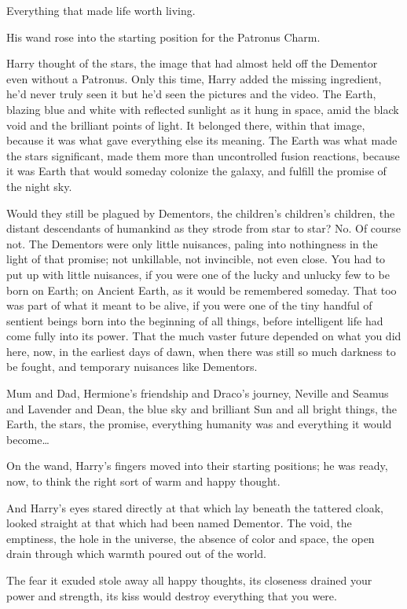 Everything that made life worth living.

His wand rose into the starting position for the Patronus Charm.

Harry thought of the stars, the image that had almost held off the Dementor
even without a Patronus. Only this time, Harry added the missing ingredient,
he'd never truly seen it but he'd seen the pictures and the video. The Earth,
blazing blue and white with reflected sunlight as it hung in space, amid the
black void and the brilliant points of light. It belonged there, within that
image, because it was what gave everything else its meaning. The Earth was what
made the stars significant, made them more than uncontrolled fusion reactions,
because it was Earth that would someday colonize the galaxy, and fulfill the
promise of the night sky.

Would they still be plagued by Dementors, the children's children's children,
the distant descendants of humankind as they strode from star to star? No. Of
course not. The Dementors were only little nuisances, paling into nothingness
in the light of that promise; not unkillable, not invincible, not even close.
You had to put up with little nuisances, if you were one of the lucky and
unlucky few to be born on Earth; on Ancient Earth, as it would be remembered
someday. That too was part of what it meant to be alive, if you were one of the
tiny handful of sentient beings born into the beginning of all things, before
intelligent life had come fully into its power. That the much vaster future
depended on what you did here, now, in the earliest days of dawn, when there
was still so much darkness to be fought, and temporary nuisances like Dementors.

Mum and Dad, Hermione's friendship and Draco's journey, Neville and Seamus and
Lavender and Dean, the blue sky and brilliant Sun and all bright things, the
Earth, the stars, the promise, everything humanity was and everything it would
become{\ldots}

On the wand, Harry's fingers moved into their starting positions; he was ready,
now, to think the right sort of warm and happy thought.

And Harry's eyes stared directly at that which lay beneath the tattered cloak,
looked straight at that which had been named Dementor. The void, the emptiness,
the hole in the universe, the absence of color and space, the open drain
through which warmth poured out of the world.

The fear it exuded stole away all happy thoughts, its closeness drained your
power and strength, its kiss would destroy everything that you were.

